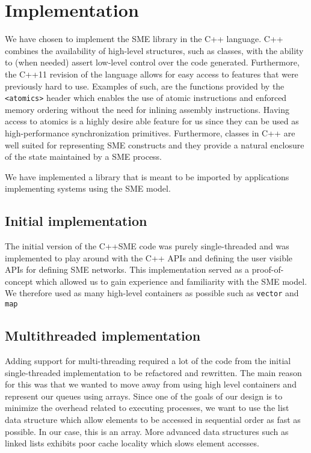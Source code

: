 \chapter{Implementation}

We have chosen to implement the SME library in the C++ language. C++
combines the availability of high-level structures, such as classes,
with the ability to (when needed) assert low-level control over the
code generated. Furthermore, the C++11 \cite{cc11std} revision of the
language allows for easy access to features that were previously hard
to use. Examples of such, are the functions provided by the
\texttt{<atomics>} header which enables the use of atomic instructions
and enforced memory ordering without the need for inlining assembly instructions. Having access to atomics is a highly desire able feature for
us since they can be used as high-performance synchronization
primitives. Furthermore, classes in C++ are well suited for
representing SME constructs and they provide a natural enclosure of
the state maintained by a SME process.

We have implemented a library that is meant to be imported by
applications implementing systems using the SME model.






\section{Initial implementation}
The initial version of the C++SME code was purely single-threaded and
was implemented to play around with the C++ APIs and defining the user
visible APIs for defining SME networks. This implementation served as
a proof-of-concept which allowed us to gain experience and familiarity
with the SME model. We therefore used as many high-level containers as
possible such as \texttt{vector} and \texttt{map}

\section{Multithreaded implementation}
Adding support for multi-threading required a lot of the code from the
initial single-threaded implementation to be refactored and
rewritten. The main reason for this was that we wanted to move away
from using high level containers and represent our queues using
arrays. Since one of the goals of our design is to minimize the
overhead related to executing processes, we want to use the list data
structure which allow elements to be accessed in sequential order as
fast as possible. In our case, this is an array. More advanced
data structures such as linked lists exhibits poor cache locality
which slows element accesses.

